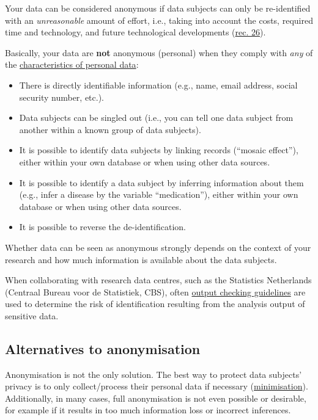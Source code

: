 \documentclass[
]{book}
\providecommand{\tightlist}{%
  \setlength{\itemsep}{0pt}\setlength{\parskip}{0pt}}
\begin{document}
Your data can be considered anonymous if data subjects can only be re-identified
with an \emph{unreasonable} amount of effort, i.e., taking into account the costs,
required time and technology, and future technological developments
(\href{https://gdpr-info.eu/recitals/no-26/}{rec. 26}).

Basically, your data are \textbf{not} anonymous (personal) when they comply with
\emph{any} of the \protect\hyperlink{personal-data-assess}{characteristics of personal data}:

\begin{itemize}
\tightlist
\item
  There is directly identifiable information (e.g., name, email address, social
  security number, etc.).
\item
  Data subjects can be singled out (i.e., you can tell one data subject from
  another within a known group of data subjects).
\item
  It is possible to identify data subjects by linking records (``mosaic effect''),
  either within your own database or when using other data sources.
\item
  It is possible to identify a data subject by inferring information about them
  (e.g., infer a disease by the variable ``medication''), either within
  your own database or when using other data sources.
\item
  It is possible to reverse the de-identification.
\end{itemize}

Whether data can be seen as anonymous strongly depends on the context of your
research and how much information is available about the data subjects.

When collaborating with research data centres, such as the Statistics Netherlands
(Centraal Bureau voor de Statistiek, CBS), often
\href{https://cros-legacy.ec.europa.eu/system/files/dwb_standalone-document_output-checking-guidelines.pdf}{output checking guidelines}
are used to determine the risk of identification resulting from the analysis
output of sensitive data.

\hypertarget{anonymisation-alternatives}{%
\subsection{Alternatives to anonymisation}\label{anonymisation-alternatives}}

Anonymisation is not the only solution. The best way to protect data subjects'
privacy is to only collect/process their personal data if necessary
(\protect\hyperlink{minimise}{minimisation}). Additionally, in many cases, full anonymisation
is not even possible or desirable, for example if it results in too much
information loss or incorrect inferences.
\end{document}
